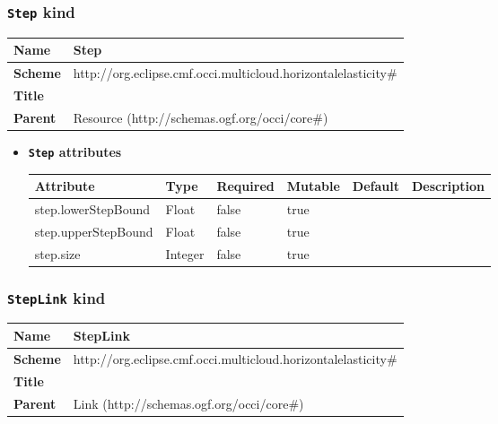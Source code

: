 \subsubsection{\texttt{Step} kind}
\begin{center}
\begin{tabular}{|l|l|}
  \hline
  \textbf{Name} & Step \\
  \hline  
  \textbf{Scheme} & http://org.eclipse.cmf.occi.multicloud.horizontalelasticity\# \\
  \hline
  \textbf{Title} &  \\
  \hline
  \textbf{Parent} & Resource (http://schemas.ogf.org/occi/core\#) \\
  \hline
\end{tabular}
\end{center}
\begin{itemize}
\item \textbf{\texttt{Step} attributes}

\begin{tabularx}{\textwidth}{|l|l|p{1.4cm}|p{1.3cm}|l|X|}
  \hline
  \textbf{Attribute} & \textbf{Type} & \textbf{Required} & \textbf{Mutable} & \textbf{Default} & \textbf{Description} \\
  \hline  
  step.lowerStepBound & Float & false & true &  &  \\
  \hline
  step.upperStepBound & Float & false & true &  &  \\
  \hline
  step.size & Integer & false & true &  &  \\
  \hline
\end{tabularx}
\end{itemize}



\subsubsection{\texttt{StepLink} kind}
\begin{center}
\begin{tabular}{|l|l|}
  \hline
  \textbf{Name} & StepLink \\
  \hline  
  \textbf{Scheme} & http://org.eclipse.cmf.occi.multicloud.horizontalelasticity\# \\
  \hline
  \textbf{Title} &  \\
  \hline
  \textbf{Parent} & Link (http://schemas.ogf.org/occi/core\#) \\
  \hline
\end{tabular}
\end{center}



